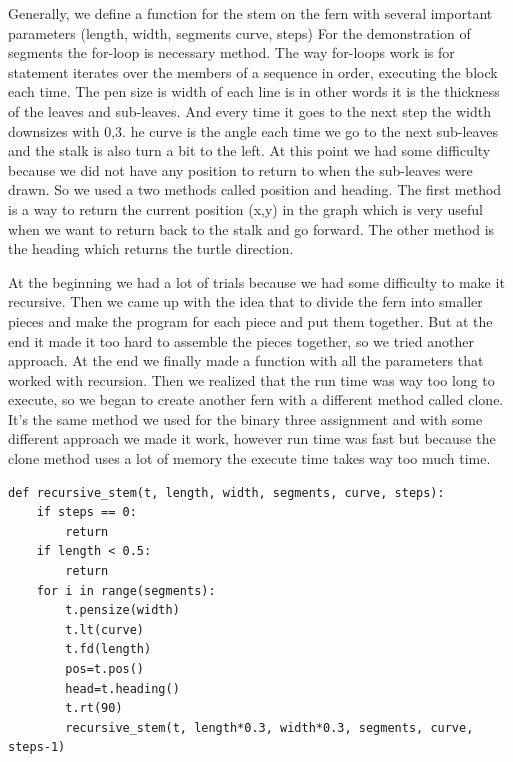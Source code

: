 \documentclass[titlepage]{article}
\begin{document}
Generally, we define a function for the stem on the fern with several important parameters (length, width, segments curve, steps) For the demonstration of segments the for-loop is necessary method. The way for-loops work is for statement iterates over the members of a sequence in order, executing the block each time. The pen size is width of each line is in other words it is the thickness of the leaves and sub-leaves. And every time it goes to the next step the width downsizes with 0,3. he curve is the angle each time we go to the next sub-leaves and the stalk is also turn a bit to the left. At this point we had some difficulty because we did not have any position to return to when the sub-leaves were drawn. So we used a two methods called position and heading. The first method is a way to return the current position (x,y) in the graph which is very useful when we want to return back to the stalk and go forward. The other method is the heading which returns the turtle direction.
\par
At the beginning we had a lot of trials because we had some difficulty to make it recursive. Then we came up with the idea that to divide the fern into smaller pieces and make the program for each piece and put them together. But at the end it made it too hard to assemble the pieces together, so we tried another approach. At the end we finally made a function with all the parameters that worked with recursion. Then we realized that the run time was way too long to execute, so we began to create another fern with a different method called clone. It’s the same method we used for the binary three assignment and with some different approach we made it work, however run time was fast but because the clone method uses a lot of memory the execute time takes way too much time. 

\begin{verbatim}  
def recursive_stem(t, length, width, segments, curve, steps):
    if steps == 0:
        return
    if length < 0.5:
        return
    for i in range(segments):
        t.pensize(width)
        t.lt(curve)
        t.fd(length)
        pos=t.pos()
        head=t.heading()
        t.rt(90)
        recursive_stem(t, length*0.3, width*0.3, segments, curve, steps-1)
\end{verbatim}
\end{document}
